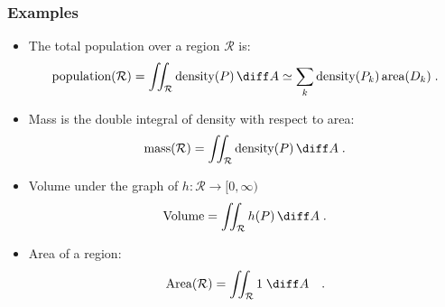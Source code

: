 \begin{frame}
\frametitle{Examples}
\begin{itemize}
\item The total population over a region $\mathcal{R}$ is:
\[
\text{population}(\mathcal{R}) = \iint_{\mathcal{R}} \text{density}(P) \, \diff A \simeq \sum_k \text{density}(P_k) \, \text{area}(D_k) \; .
\]
\item<2-> Mass is the double integral of density with respect to area:
\[
\text{mass}(\mathcal{R}) = \iint_{\mathcal{R}} \text{density}(P) \, \diff A\; .
\]
\item<3-> Volume under the graph of $h\colon \mathcal{R} \to [0,\infty)$
\[
\text{Volume} = \iint_{\mathcal{R}} h(P) \, \diff A \; .
\]
\item<4-> Area of a region:
\[
\text{Area}(\mathcal{R}) = \iint_{\mathcal{R}} 1 \; \diff A\quad .
\]
\end{itemize}
\end{frame}